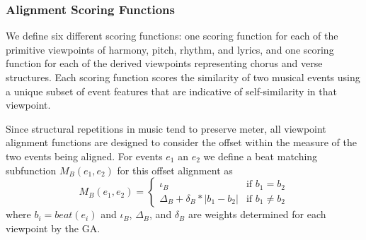 \documentclass[phd,electronic,oneside,twosidetoc,letterpaper,chaptercenter,parttop,lol,lof,lot]{byumsphd}
\begin{document}

\subsubsection{Alignment Scoring Functions}


We define six different scoring functions: one scoring function for each of the primitive viewpoints of harmony, pitch, rhythm, and lyrics, and one scoring function for each of the derived viewpoints representing chorus and verse structures. Each scoring function scores the similarity of two musical events using a unique subset of event features that are indicative of self-similarity in that viewpoint.

Since structural repetitions in music tend to preserve meter, all viewpoint alignment functions are designed to consider the offset within the measure of the two events being aligned. For events $e_1$ an $e_2$ we define a beat matching subfunction $M_B(e_1,e_2)$ for this offset alignment as
\[
  M_B(e_1,e_2) =
  \begin{cases}
	\iota_B & \text{if } b_1 = b_2 \\
	\Delta_B + \delta_B * |b_1 - b_2| & \text{if } b_1 \neq b_2 
  \end{cases}
\]
\noindent where $b_i=beat(e_i)$ and $\iota_B$, $\Delta_B$, and $\delta_B$ are weights determined for each viewpoint by the GA.
\end{document}
